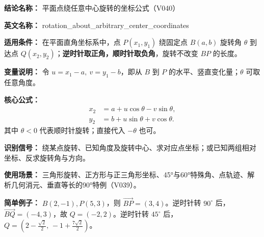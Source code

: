 \textbf{结论名称：} 平面点绕任意中心旋转的坐标公式（V040）

\textbf{英文名称：} rotation\_about\_arbitrary\_center\_coordinates

\textbf{适用条件：} 在平面直角坐标系中，点 $P(x_1,y_1)$ 绕固定点 $B(a,b)$ 旋转角 $\theta$ 到达点 $Q(x_2,y_2)$；\textbf{逆时针取正角，顺时针取负角}，旋转不改变 $BP$ 的长度。

\textbf{变量说明：} 令 $u=x_1-a,\ v=y_1-b$，即从 $B$ 到 $P$ 的水平、竖直变化量；$\theta$ 可取任意角度。

\textbf{核心公式：}
\[
\boxed{\begin{aligned}
x_2&=a+u\cos\theta-v\sin\theta,\\
y_2&=b+u\sin\theta+v\cos\theta.
\end{aligned}}
\]
其中 $\theta<0$ 代表顺时针旋转；直接代入 $-\theta$ 也可。

\textbf{识别信号：} 绕某点旋转、已知角度及旋转中心、求对应点坐标；或已知两组相对坐标、反求旋转角与方向。

\textbf{使用场景：} 三角形旋转、正方形与正三角形坐标、45°与60°特殊角、点轨迹、解析几何消元、垂直等长的90°特例（V039）。

\textbf{简单例子：} $B(2,-1), P(5,3)$，则 $\overrightarrow{BP}=(3,4)$。逆时针转 $90^\circ$ 后，$\overrightarrow{BQ}=(-4,3)$，故 $Q=(-2,2)$。逆时针转 $45^\circ$ 后，$Q=(2-\tfrac{\sqrt2}{2},\,-1+\tfrac{7\sqrt2}{2})$。
